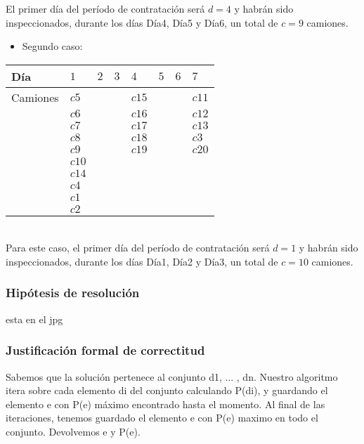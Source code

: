 \documentclass[11pt, a4paper, twoside]{article}
\begin{document}
El primer d\'ia del per\'iodo de contrataci\'on ser\'a $d=4$ y habr\'an sido inspeccionados, durante los d\'ias D\'ia4, D\'ia5 y D\'ia6, un total de $c=9$ camiones. \\

\begin{itemize}
	\item Segundo caso:
\end{itemize} 

\begin{tabular}{|l|l|l|l|l|l|l|l|}
	\hline
	Día          &  $1$  & $2$   & $3$   & $4$    & $5$ & $6$ & $7$   \\
	\hline
	Camiones     &  $c5$ &       &       & $c15$  &     &     & $c11$ \\
				 &  $c6$ &       &       & $c16$  &     &     & $c12$ \\    
				 &	$c7$ &       &       & $c17$  &     &     & $c13$ \\  
				 &	$c8$ &       &       & $c18$  &     &     & $c3$  \\
				 &	$c9$ &       &       & $c19$  &     &     & $c20$ \\
				 &	$c10$&       &       &        &     &     &       \\
				 &	$c14$&       &       &        &     &     &       \\
				 &	$c4$ &       &       &        &     &     &       \\
				 &	$c1$ &       &       &        &     &     &       \\
				 &	$c2$ &       &       &        &     &     &       \\
	\hline
\end{tabular} \\

Para este caso, el primer d\'ia del per\'iodo de contrataci\'on ser\'a $d=1$ y habr\'an sido inspeccionados, durante los d\'ias D\'ia1, D\'ia2 y D\'ia3, un total de $c=10$ camiones. 


\subsubsection{Hipótesis de resolución}
esta en el jpg
\subsubsection{Justificación formal de correctitud}
Sabemos que la soluci\'on pertenece al conjunto {d1, ... , dn}. Nuestro algoritmo itera sobre cada elemento di del conjunto calculando P(di), y guardando el elemento e con P(e) m\'aximo encontrado hasta el momento. Al final de las iteraciones, tenemos guardado el elemento e con P(e) maximo en todo el conjunto. Devolvemos e y P(e).
\end{document}
